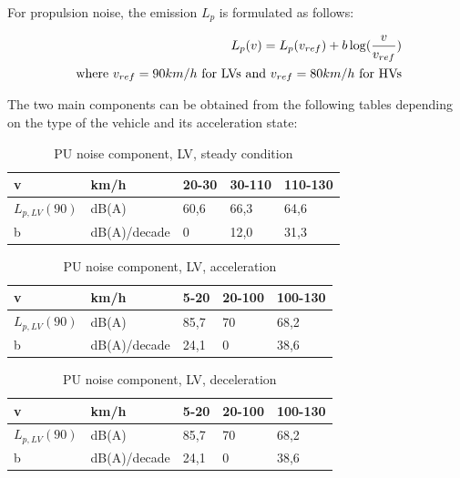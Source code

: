 \documentclass{article}
\begin{document}
\noindent For propulsion noise, the emission $L_{p}$ is formulated as follows:

\begin{equation}
    \label{RNC_LV}
    \centering
    \begin{aligned}
        L_{p}(v) = L_{p}(v_{ref})+b\log(\frac{v}{v_{ref}}) \\
        \text{ where } v_{ref}=90km/h \text{ for LVs and } v_{ref}=80km/h \text{ for HVs}
    \end{aligned}
\end{equation}

\noindent The two main components can be {\color{red} obtained} from the following tables depending {\color{red} on} the type of the vehicle and its acceleration state:

\begin{table}[H]
\centering
\caption{PU noise component, LV, steady condition}
\label{PU noise component, LV, steady condition}
\begin{tabular}{|lllll|}
\hline
v & km/h  & 20-30 & 30-110 & 110-130 \\ \hline
$L_{p,LV}(90)$ & dB(A) & 60,6  & 66,3   & 64,6    \\
b & dB(A)/decade & 0     & 12,0   & 31,3    \\ \hline
\end{tabular}
\end{table}

\begin{table}[H]
\centering
\caption{PU noise component, LV, acceleration}
\label{PU noise component, LV, acceleration}
\begin{tabular}{|lllll|}
\hline
v & km/h  & 5-20 & 20-100 & 100-130 \\ \hline
$L_{p,LV}(90)$ & dB(A) & 85,7 & 70     & 68,2    \\
b & dB(A)/decade & 24,1 & 0      & 38,6    \\ \hline
\end{tabular}
\end{table}

\begin{table}[H]
\centering
\caption{PU noise component, LV, deceleration}
\label{PU noise component, LV, deceleration}
\begin{tabular}{|lllll|}
\hline
v & km/h  & 5-20 & 20-100 & 100-130 \\ \hline
$L_{p,LV}(90)$ & dB(A) & 85,7 & 70     & 68,2    \\
b & dB(A)/decade & 24,1 & 0      & 38,6    \\ \hline
\end{tabular}
\end{table}
\end{document}
